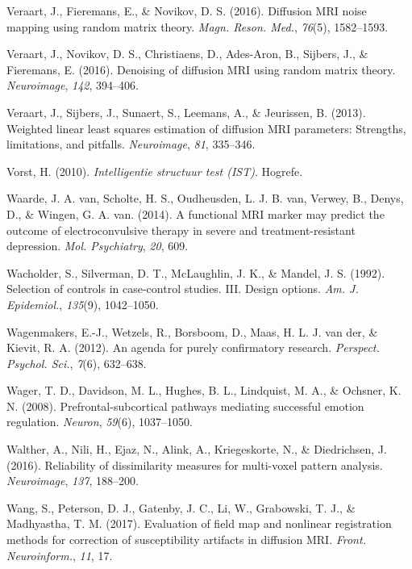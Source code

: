 \documentclass[11pt,american,]{memoir} %
\begin{document}
\leavevmode\hypertarget{ref-Veraart2016-zi}{}%
Veraart, J., Fieremans, E., \& Novikov, D. S. (2016). Diffusion MRI noise mapping using random matrix theory. \emph{Magn. Reson. Med.}, \emph{76}(5), 1582--1593.

\leavevmode\hypertarget{ref-Veraart2016-rv}{}%
Veraart, J., Novikov, D. S., Christiaens, D., Ades-Aron, B., Sijbers, J., \& Fieremans, E. (2016). Denoising of diffusion MRI using random matrix theory. \emph{Neuroimage}, \emph{142}, 394--406.

\leavevmode\hypertarget{ref-Veraart2013-ya}{}%
Veraart, J., Sijbers, J., Sunaert, S., Leemans, A., \& Jeurissen, B. (2013). Weighted linear least squares estimation of diffusion MRI parameters: Strengths, limitations, and pitfalls. \emph{Neuroimage}, \emph{81}, 335--346.

\leavevmode\hypertarget{ref-Vorst2010-ex}{}%
Vorst, H. (2010). \emph{Intelligentie structuur test (IST)}. Hogrefe.

\leavevmode\hypertarget{ref-Van_Waarde2014-sh}{}%
Waarde, J. A. van, Scholte, H. S., Oudheusden, L. J. B. van, Verwey, B., Denys, D., \& Wingen, G. A. van. (2014). A functional MRI marker may predict the outcome of electroconvulsive therapy in severe and treatment-resistant depression. \emph{Mol. Psychiatry}, \emph{20}, 609.

\leavevmode\hypertarget{ref-Wacholder1992-wb}{}%
Wacholder, S., Silverman, D. T., McLaughlin, J. K., \& Mandel, J. S. (1992). Selection of controls in case-control studies. III. Design options. \emph{Am. J. Epidemiol.}, \emph{135}(9), 1042--1050.

\leavevmode\hypertarget{ref-Wagenmakers2012-vd}{}%
Wagenmakers, E.-J., Wetzels, R., Borsboom, D., Maas, H. L. J. van der, \& Kievit, R. A. (2012). An agenda for purely confirmatory research. \emph{Perspect. Psychol. Sci.}, \emph{7}(6), 632--638.

\leavevmode\hypertarget{ref-wager2008prefrontal}{}%
Wager, T. D., Davidson, M. L., Hughes, B. L., Lindquist, M. A., \& Ochsner, K. N. (2008). Prefrontal-subcortical pathways mediating successful emotion regulation. \emph{Neuron}, \emph{59}(6), 1037--1050.

\leavevmode\hypertarget{ref-Walther2016-je}{}%
Walther, A., Nili, H., Ejaz, N., Alink, A., Kriegeskorte, N., \& Diedrichsen, J. (2016). Reliability of dissimilarity measures for multi-voxel pattern analysis. \emph{Neuroimage}, \emph{137}, 188--200.

\leavevmode\hypertarget{ref-Wang2017-nk}{}%
Wang, S., Peterson, D. J., Gatenby, J. C., Li, W., Grabowski, T. J., \& Madhyastha, T. M. (2017). Evaluation of field map and nonlinear registration methods for correction of susceptibility artifacts in diffusion MRI. \emph{Front. Neuroinform.}, \emph{11}, 17.
\end{document}
